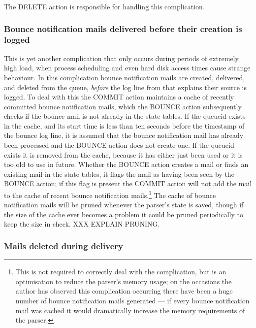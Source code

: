 The DELETE action is responsible for handling this complication.

\subsubsection{Bounce notification mails delivered before their creation is
logged}

\label{Bounce notification mails delivered before their creation is logged}

This is yet another complication that only occurs during periods of
extremely high load, when process scheduling and even hard disk access
times cause strange behaviour.  In this complication bounce notification
mails are created, delivered, and deleted from the queue, \textit{before\/}
the log line from  that explains their source is logged.  To
deal with this the COMMIT action maintains a cache of recently committed
bounce notification mails, which the BOUNCE action subsequently checks if
the bounce mail is not already in the state tables. If the queueid exists
in the cache, and its start time is less than ten seconds before the
timestamp of the bounce log line, it is assumed that the bounce
notification mail has already been processed and the BOUNCE action does not
create one.  If the queueid exists it is removed from the cache, because it
has either just been used or it is too old to use in future.  Whether the
BOUNCE action creates a mail or finds an existing mail in the state tables,
it flags the mail as having been seen by the BOUNCE action; if this flag is
present the COMMIT action will not add the mail to the cache of recent
bounce notification mails.\footnote{This is not required to correctly deal
with the complication, but is an optimisation to reduce the parser's memory
usage; on the occasions the author has observed this complication occurring
there have been a huge number of bounce notification mails generated --- if
every bounce notification mail was cached it would dramatically increase
the memory requirements of the parser.}  The cache of bounce notification
mails will be pruned whenever the parser's state is saved, though if the
size of the cache ever becomes a problem it could be pruned periodically to
keep the size in check.  XXX EXPLAIN PRUNING\@.

\subsubsection{Mails deleted during delivery}

